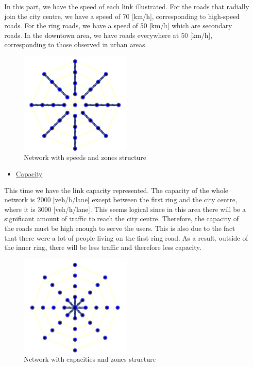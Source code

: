 \documentclass[a4paper, 12pt,oneside]{article}
\begin{document}
In this part, we have the speed of each link illustrated.
For the roads that radially join the city centre, we have a speed of 70 [km/h], corresponding to high-speed roads. For the ring roads, we have a speed of 50 [km/h] which are secondary roads. In the downtown area, we have roads everywhere at 50 [km/h], corresponding to those observed in urban areas.

\begin{figure}[H]
    \centering
    \includegraphics[width=0.5\textwidth]{Images/capture zone speed.png}
    \caption{Network with speeds and zones structure}
\end{figure}

\begin{itemize}
    \item \underline{Capacity}
\end{itemize}

This time we have the link capacity represented.
The capacity of the whole network is 2000 [veh/h/lane] except between the first ring and the city centre, where it is 3000 [veh/h/lane]. This seems logical since in this area there will be a significant amount of traffic to reach the city centre. Therefore, the capacity of the roads must be high enough to serve the users. This is also due to the fact that there were a lot of people living on the first ring road. As a result, outside of the inner ring, there will be less traffic and therefore less capacity.

\begin{figure}[H]
    \centering
    \includegraphics[width=0.5\textwidth]{Images/capture zone capacity.png}
    \caption{Network with capacities and zones structure}
\end{figure}
\end{document}
